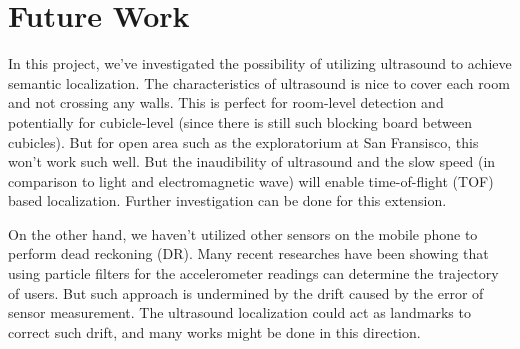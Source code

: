 
\section{Future Work}
\label{sec:future-work}

In this project, we've investigated the possibility of utilizing ultrasound to achieve semantic localization. The characteristics of ultrasound is nice to cover each room and not crossing any walls. This is perfect for room-level detection and potentially for cubicle-level (since there is still such blocking board between cubicles). But for open area such as the exploratorium at San Fransisco, this won't work such well. But the inaudibility of ultrasound and the slow speed (in comparison to light and electromagnetic wave) will enable time-of-flight (TOF) based localization. Further investigation can be done for this extension.

On the other hand, we haven't utilized other sensors on the mobile phone to perform dead reckoning (DR). Many recent researches have been showing that using particle filters for the accelerometer readings can determine the trajectory of users. But such approach is undermined by the drift caused by the error of sensor measurement. The ultrasound localization could act as landmarks to correct such drift, and many works might be done in this direction.
